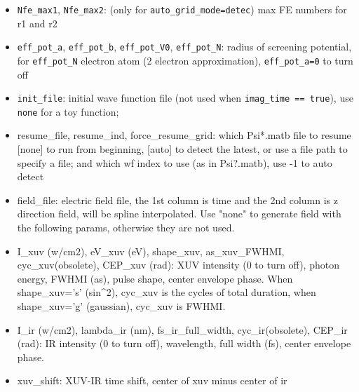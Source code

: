 \begin{itemize}
\item \verb`Nfe_max1`, \verb`Nfe_max2`: (only for \verb`auto_grid_mode=detec`) max FE numbers for r1 and r2
\item \verb`eff_pot_a`, \verb`eff_pot_b`, \verb`eff_pot_V0`, \verb`eff_pot_N`: radius of screening potential, for \verb`eff_pot_N` electron atom (2 electron approximation), \verb`eff_pot_a=0` to turn off
\item \verb`init_file`: initial wave function file (not used when \verb`imag_time == true`), use \verb`none` for a toy function;
\item resume_file, resume_ind, force_resume_grid: which Psi*.matb file to resume [none] to run from beginning, [auto] to detect the latest, or use a file path to specify a file; and which wf index to use (as in Psi?.matb), use -1 to auto detect
\item field_file: electric field file, the 1st column is time and the 2nd column is z direction field, will be spline interpolated. Use "none" to generate field with the following params, otherwise they are not used.
\item I_xuv (w/cm2), eV_xuv (eV), shape_xuv, as_xuv_FWHMI, cyc_xuv(obsolete), CEP_xuv (rad): XUV intensity (0 to turn off), photon energy, FWHMI (as), pulse shape, center envelope phase. When shape_xuv='s' (sin^2), cyc_xuv is the cycles of total duration, when shape_xuv='g' (gaussian), cyc_xuv is FWHMI.
\item I_ir (w/cm2), lambda_ir (nm), fs_ir_full_width, cyc_ir(obsolete), CEP_ir (rad): IR intensity (0 to turn off), wavelength, full width (fs), center envelope phase.
\item xuv_shift: XUV-IR time shift, center of xuv minus center of ir
\end{itemize}

